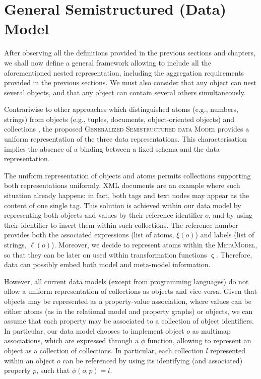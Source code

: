 
\section{General Semistructured (Data) Model}\label{def:mofgeneral}
After observing all the definitions provided in the previous sections and chapters, we shall now define a general framework allowing to include all the aforementioned nested representation, including the aggregation requirements provided in the previous sections. We must also consider that any object can nest several objects, and that any object can contain several others simultaneously. 

Contrariwise to other approaches which distinguished atoms (e.g., numbers, strings) from objects (e.g., tuples, documents, object-oriented objects) and collections \cite{Magnani06}, the proposed \textsc{Generalized Semistructured data Model} provides a uniform representation of the three data representations. This characterisation implies the absence of a binding between a fixed schema and the data representation.

The uniform representation of objects and atoms permits collections supporting both representations uniformly. XML documents are an example   where such situation already happens: in fact, both tags and text nodes may appear as the content of one single tag. This solution is achieved within our data model by representing both objects and values by their reference identifier $o$, and by using their identifier to insert them within such collections. The reference number provides both the associated expressions (list of atoms, $\xi(o)$) and labels (list of strings, $\ell(o)$). Moreover, we decide to represent atoms within the \textsc{MetaModel}, so that they can be later on used within transformation functions $\stigma$. Therefore, data can possibly embed both model and meta-model information.

However, all current data models (except from programming languages) do not allow a uniform representation of collections as objects and vice-versa. Given that objects may be represented as a property-value association, where values can be either atoms (as in the relational model and property graphs) or objects, we can assume that each property may be associated to a collection of object identifiers. In particular, our data model chooses to implement object $o$ as multimap associations, which are expressed through a $\phi$ function, allowing to represent an object as a collection of collections. In particular, each collection $l$ represented within an object $o$ can be referenced by using its identifying (and associated) property $p$, such that $\phi(o,p)=l$.


